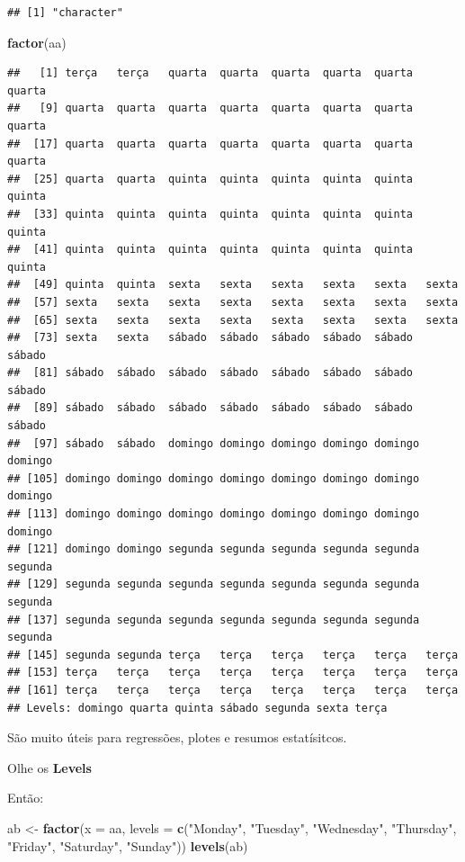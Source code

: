 \documentclass[]{book}
\newenvironment{Shaded}{\begin{snugshade}}{\end{snugshade}}
\newcommand{\KeywordTok}[1]{\textcolor[rgb]{0.13,0.29,0.53}{\textbf{#1}}}
\newcommand{\DataTypeTok}[1]{\textcolor[rgb]{0.13,0.29,0.53}{#1}}
\newcommand{\StringTok}[1]{\textcolor[rgb]{0.31,0.60,0.02}{#1}}
\newcommand{\NormalTok}[1]{#1}
\begin{document}
\begin{verbatim}
## [1] "character"
\end{verbatim}

\begin{Shaded}
\begin{Highlighting}[]
\KeywordTok{factor}\NormalTok{(aa)}
\end{Highlighting}
\end{Shaded}

\begin{verbatim}
##   [1] terça   terça   quarta  quarta  quarta  quarta  quarta  quarta 
##   [9] quarta  quarta  quarta  quarta  quarta  quarta  quarta  quarta 
##  [17] quarta  quarta  quarta  quarta  quarta  quarta  quarta  quarta 
##  [25] quarta  quarta  quinta  quinta  quinta  quinta  quinta  quinta 
##  [33] quinta  quinta  quinta  quinta  quinta  quinta  quinta  quinta 
##  [41] quinta  quinta  quinta  quinta  quinta  quinta  quinta  quinta 
##  [49] quinta  quinta  sexta   sexta   sexta   sexta   sexta   sexta  
##  [57] sexta   sexta   sexta   sexta   sexta   sexta   sexta   sexta  
##  [65] sexta   sexta   sexta   sexta   sexta   sexta   sexta   sexta  
##  [73] sexta   sexta   sábado  sábado  sábado  sábado  sábado  sábado 
##  [81] sábado  sábado  sábado  sábado  sábado  sábado  sábado  sábado 
##  [89] sábado  sábado  sábado  sábado  sábado  sábado  sábado  sábado 
##  [97] sábado  sábado  domingo domingo domingo domingo domingo domingo
## [105] domingo domingo domingo domingo domingo domingo domingo domingo
## [113] domingo domingo domingo domingo domingo domingo domingo domingo
## [121] domingo domingo segunda segunda segunda segunda segunda segunda
## [129] segunda segunda segunda segunda segunda segunda segunda segunda
## [137] segunda segunda segunda segunda segunda segunda segunda segunda
## [145] segunda segunda terça   terça   terça   terça   terça   terça  
## [153] terça   terça   terça   terça   terça   terça   terça   terça  
## [161] terça   terça   terça   terça   terça   terça   terça   terça  
## Levels: domingo quarta quinta sábado segunda sexta terça
\end{verbatim}

São muito úteis para regressões, plotes e resumos estatísitcos.

Olhe os \textbf{Levels}

Então:

\begin{Shaded}
\begin{Highlighting}[]
\NormalTok{ab <-}\StringTok{ }\KeywordTok{factor}\NormalTok{(}\DataTypeTok{x =}\NormalTok{ aa,}
             \DataTypeTok{levels =} \KeywordTok{c}\NormalTok{(}\StringTok{"Monday"}\NormalTok{, }\StringTok{"Tuesday"}\NormalTok{,  }\StringTok{"Wednesday"}\NormalTok{,  }\StringTok{"Thursday"}\NormalTok{,}
                        \StringTok{"Friday"}\NormalTok{, }\StringTok{"Saturday"}\NormalTok{, }\StringTok{"Sunday"}\NormalTok{))}
\KeywordTok{levels}\NormalTok{(ab)}
\end{Highlighting}
\end{Shaded}
\end{document}
